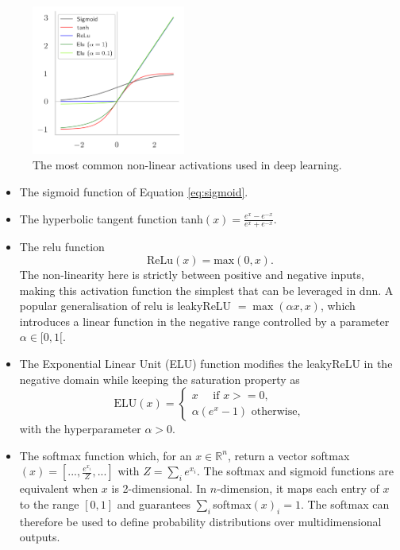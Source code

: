 \begin{figure}
    \begin{center}
        \includegraphics[width=0.45\textwidth]{Images/ML/activations.png}
        \caption{The most common non-linear activations used in deep learning.} 
        \label{fig:commonAct}
    \end{center}
\end{figure}
\begin{itemize}
    \item The sigmoid function of Equation \ref{eq:sigmoid}.
    \item The hyperbolic tangent function tanh$(x) = \frac{e^x - e^{-x}}{e^x + e^{-x}}$.
    \item The \gls{relu} function\cite{agarap2019deep}
    \begin{equation}\label{eq:relu}
        \text{ReLu}(x) = \text{max}(0, x).
    \end{equation}
    The non-linearity here is strictly between positive and negative inputs, making this activation function the simplest that can be leveraged in \gls{dnn}. A popular generalisation of \gls{relu} is leakyReLU $= \max(\alpha x, x)$, which introduces a linear function in the negative range controlled by a parameter $\alpha \in [0, 1[$. 
    \item The Exponential Linear Unit (ELU) function modifies the leakyReLU in the negative domain while keeping the saturation property as
    \begin{equation}\label{eq:elu}
        \text{ELU}(x) = 
        \begin{cases}
            x \quad \text{ if } x >= 0, \\
            \alpha (e^x - 1) \text{ otherwise},
        \end{cases}
    \end{equation}
    with the hyperparameter $\alpha > 0$.
    \item The softmax function which, for an $x \in \mathbb{R}^n$, return a vector softmax$(x) = [..., \frac{e^{x_i}}{Z}, ...]$ with $Z = \sum_i e^{x_i}$. The softmax and sigmoid functions are equivalent when $x$ is 2-dimensional. In $n$-dimension, it maps each entry of $x$ to the range $[0, 1]$ and guarantees $\sum_i $softmax$(x)_i = 1$. The softmax can therefore be used to define probability distributions over multidimensional outputs.
\end{itemize}
